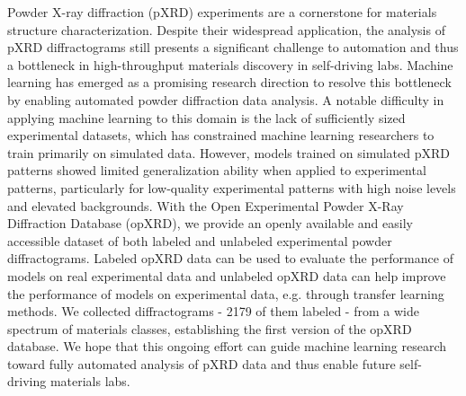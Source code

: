 Powder X-ray diffraction (pXRD) experiments are a cornerstone for materials structure characterization.
Despite their widespread application, the analysis of pXRD diffractograms still presents a significant challenge to automation and thus a bottleneck in high-throughput materials discovery in self-driving labs.
Machine learning has emerged as a promising research direction to resolve this bottleneck by enabling automated powder diffraction data analysis.
A notable difficulty in applying machine learning to this domain is the lack of sufficiently sized experimental datasets, which has constrained machine learning researchers to train primarily on simulated data. However, models trained on simulated pXRD patterns showed limited generalization ability when applied to experimental patterns, particularly for low-quality experimental patterns with high noise levels and elevated backgrounds.
With the Open Experimental Powder X-Ray Diffraction Database (opXRD), we provide an openly available and easily accessible dataset of both labeled and unlabeled experimental powder diffractograms.
Labeled opXRD data can be used to evaluate the performance of models on real experimental data and unlabeled opXRD data can help improve the performance of models on experimental data, e.g. through transfer learning methods.
We collected \numpatterns diffractograms - 2179 of them labeled - from a wide spectrum of materials classes, establishing the first version of the opXRD database.
We hope that this ongoing effort can guide machine learning research toward fully automated analysis of pXRD data and thus enable future self-driving materials labs.
